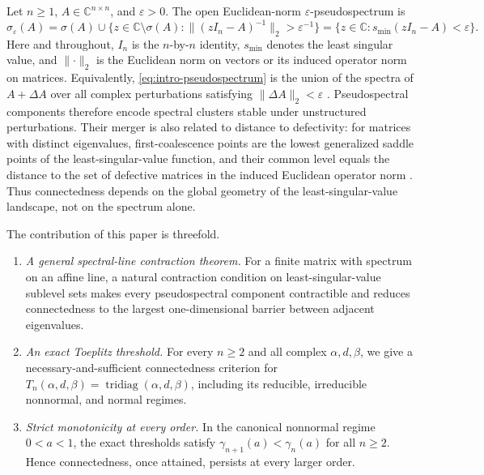 \documentclass[11pt,a4paper]{article}
\numberwithin{equation}{section}
\DeclareMathOperator{\tridiag}{tridiag}
\newcommand{\C}{\mathbb C}
\begin{document}
Let \(n\geq1\), \(A\in\C^{n\times n}\), and \(\varepsilon>0\).  The open
Euclidean-norm \(\varepsilon\)-pseudospectrum is
\begin{equation}\label{eq:intro-pseudospectrum}
 \sigma_\varepsilon(A)
 =\sigma(A)\cup
 \{z\in\C\setminus\sigma(A):
   \lVert(zI_n-A)^{-1}\rVert_2>\varepsilon^{-1}\}
 =\{z\in\C:s_{\min}(zI_n-A)<\varepsilon\}.
\end{equation}
Here and throughout, \(I_n\) is the \(n\)-by-\(n\) identity,
\(s_{\min}\) denotes the least singular value, and \(\lVert\cdot\rVert_2\)
is the Euclidean norm on vectors or its induced operator norm on matrices.
Equivalently, \eqref{eq:intro-pseudospectrum} is the union of the spectra of
\(A+\Delta A\) over all complex perturbations satisfying
\(\lVert\Delta A\rVert_2<\varepsilon\)
\cite{TrefethenEmbree2005}.  Pseudospectral components therefore encode
spectral clusters stable under unstructured perturbations.  Their merger is
also related to distance to defectivity: for matrices with distinct
eigenvalues, first-coalescence points are the lowest generalized saddle
points of the least-singular-value function, and their common level equals
the distance to the set of defective matrices in the induced Euclidean
operator norm
\cite{AlamEtAl2011}.  Thus connectedness depends on the global geometry of
the least-singular-value landscape, not on the spectrum alone.

The contribution of this paper is threefold.
\begin{enumerate}
\item \emph{A general spectral-line contraction theorem.}
For a finite matrix with spectrum on an affine line, a natural contraction
condition on least-singular-value sublevel sets makes every pseudospectral
component contractible and reduces connectedness to the largest
one-dimensional barrier between adjacent eigenvalues.

\item \emph{An exact Toeplitz threshold.}
For every \(n\geq2\) and all complex \(\alpha,d,\beta\), we give a
necessary-and-sufficient connectedness criterion for
\(T_n(\alpha,d,\beta)=\tridiag(\alpha,d,\beta)\), including its reducible,
irreducible nonnormal, and normal regimes.

\item \emph{Strict monotonicity at every order.}
In the canonical nonnormal regime \(0<a<1\), the exact thresholds satisfy
\(\gamma_{n+1}(a)<\gamma_n(a)\) for all \(n\geq2\).  Hence connectedness,
once attained, persists at every larger order.
\end{enumerate}
\end{document}
